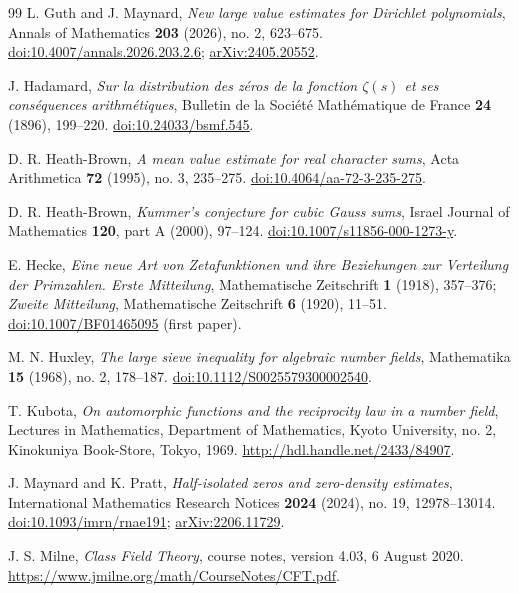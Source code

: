 \begin{thebibliography}{99}
L. Guth and J. Maynard,
\emph{New large value estimates for Dirichlet polynomials},
Annals of Mathematics \textbf{203} (2026), no. 2, 623--675.
\href{https://doi.org/10.4007/annals.2026.203.2.6}{doi:10.4007/annals.2026.203.2.6};
\href{https://arxiv.org/abs/2405.20552}{arXiv:2405.20552}.

J. Hadamard,
\emph{Sur la distribution des z\'eros de la fonction $\zeta(s)$ et ses
cons\'equences arithm\'etiques},
Bulletin de la Soci\'et\'e Math\'ematique de France \textbf{24} (1896),
199--220.
\href{https://doi.org/10.24033/bsmf.545}{doi:10.24033/bsmf.545}.

D. R. Heath-Brown,
\emph{A mean value estimate for real character sums},
Acta Arithmetica \textbf{72} (1995), no. 3, 235--275.
\href{https://doi.org/10.4064/aa-72-3-235-275}{doi:10.4064/aa-72-3-235-275}.

D. R. Heath-Brown,
\emph{Kummer's conjecture for cubic Gauss sums},
Israel Journal of Mathematics \textbf{120}, part A (2000), 97--124.
\href{https://doi.org/10.1007/s11856-000-1273-y}{doi:10.1007/s11856-000-1273-y}.

E. Hecke,
\emph{Eine neue Art von Zetafunktionen und ihre Beziehungen zur
Verteilung der Primzahlen. Erste Mitteilung},
Mathematische Zeitschrift \textbf{1} (1918), 357--376;
\emph{Zweite Mitteilung}, Mathematische Zeitschrift \textbf{6} (1920),
11--51.
\href{https://doi.org/10.1007/BF01465095}{doi:10.1007/BF01465095}
(first paper).

M. N. Huxley,
\emph{The large sieve inequality for algebraic number fields},
Mathematika \textbf{15} (1968), no. 2, 178--187.
\href{https://doi.org/10.1112/S0025579300002540}{doi:10.1112/S0025579300002540}.

T. Kubota,
\emph{On automorphic functions and the reciprocity law in a number field},
Lectures in Mathematics, Department of Mathematics, Kyoto University,
no. 2, Kinokuniya Book-Store, Tokyo, 1969.
\url{http://hdl.handle.net/2433/84907}.

J. Maynard and K. Pratt,
\emph{Half-isolated zeros and zero-density estimates},
International Mathematics Research Notices \textbf{2024} (2024), no. 19,
12978--13014.
\href{https://doi.org/10.1093/imrn/rnae191}{doi:10.1093/imrn/rnae191};
\href{https://arxiv.org/abs/2206.11729}{arXiv:2206.11729}.

J. S. Milne,
\emph{Class Field Theory}, course notes, version 4.03, 6 August 2020.
\url{https://www.jmilne.org/math/CourseNotes/CFT.pdf}.


\end{thebibliography}
